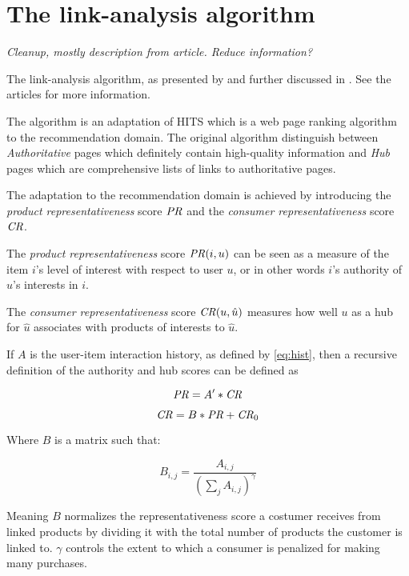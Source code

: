 \section{The link-analysis algorithm}\label{sec:linkanalysis}

\textit{Cleanup, mostly description from article. Reduce information?}

The link-analysis algorithm, as presented by \cite{huang2004link} and further discussed in \cite{huang2007comparison}. See the articles for more information.

The algorithm is an adaptation of HITS \cite{kleinberg1999authoritative} which is a web page ranking algorithm to the recommendation domain. The original algorithm distinguish between \textit{Authoritative} pages which definitely contain high-quality information and \textit{Hub} pages which are comprehensive lists of links to authoritative pages. \citep{huang2007comparison}

The adaptation to the recommendation domain is achieved by introducing the \textit{product representativeness} score $\mathit{PR}$ and the \textit{consumer representativeness} score $\mathit{CR}$.

The \textit{product representativeness} score $\mathit{PR}(i, u)$ can be seen as a measure of the item $i$'s level of interest with respect to user $u$, or in other words $i$'s authority of $u$'s interests in $i$.

The \textit{consumer representativeness} score $\mathit{CR}(u, \hat{u})$ measures how well $u$ as a hub for $\hat{u}$ associates with products of interests to $\hat{u}$.

If $A$ is the user-item interaction history, as defined by \ref{eq:hist}, 
then a recursive definition of the authority and hub scores can be defined as

\begin{equation}
    \mathit{PR} = A' * \mathit{CR}
\end{equation}

\begin{equation}
    \mathit{CR} = B * \mathit{PR} + \mathit{CR}_0
\end{equation}

Where $B$ is a matrix such that:

\begin{equation}
    B_{i, j} = \frac{ A_{i, j} }{ \left(\sum_{j} A_{i, j}\right)^\gamma }
\end{equation}

Meaning $B$ normalizes the representativeness score a costumer receives from linked products by dividing it with the total number of products the customer is linked to.  $\gamma$ controls the extent to which a consumer is penalized for making many purchases.

